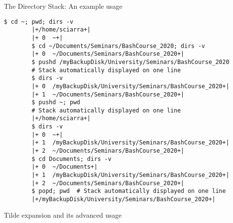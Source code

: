\begin{frame}[fragile]{The Directory Stack: An example usage}
    \vspace{-3mm}
    \begin{lstlisting}[style=MyBash]
        $ cd ~; pwd; dirs -v
        |+/home/sciarra+|
        |+ 0  ~+|
        $ cd ~/Documents/Seminars/BashCourse_2020; dirs -v
        |+ 0  ~/Documents/Seminars/BashCourse_2020+|
        $ pushd /myBackupDisk/University/Seminars/BashCourse_2020
        # Stack automatically displayed on one line
        $ dirs -v
        |+ 0  /myBackupDisk/University/Seminars/BashCourse_2020+|
        |+ 1  ~/Documents/Seminars/BashCourse_2020+|
        $ pushd ~; pwd
        # Stack automatically displayed on one line
        |+/home/sciarra+|
        $ dirs -v
        |+ 0  ~+|
        |+ 1  /myBackupDisk/University/Seminars/BashCourse_2020+|
        |+ 2  ~/Documents/Seminars/BashCourse_2020+|
        $ cd Documents; dirs -v
        |+ 0  ~/Documents+|
        |+ 1  /myBackupDisk/University/Seminars/BashCourse_2020+|
        |+ 2  ~/Documents/Seminars/BashCourse_2020+|
        $ popd; pwd  # Stack automatically displayed on one line
        |+/myBackupDisk/University/Seminars/BashCourse_2020+|
    \end{lstlisting}
\end{frame}
\begin{frame}{Tilde expansion and its advanced usage}
\end{frame}
